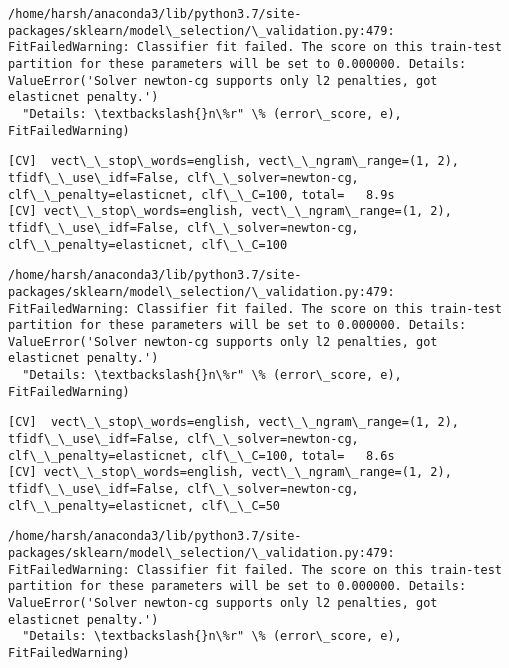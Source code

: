 \documentclass[11pt]{article}
\begin{document}
    \begin{Verbatim}[commandchars=\\\{\}]
/home/harsh/anaconda3/lib/python3.7/site-packages/sklearn/model\_selection/\_validation.py:479: FitFailedWarning: Classifier fit failed. The score on this train-test partition for these parameters will be set to 0.000000. Details: 
ValueError('Solver newton-cg supports only l2 penalties, got elasticnet penalty.')
  "Details: \textbackslash{}n\%r" \% (error\_score, e), FitFailedWarning)

    \end{Verbatim}

    \begin{Verbatim}[commandchars=\\\{\}]
[CV]  vect\_\_stop\_words=english, vect\_\_ngram\_range=(1, 2), tfidf\_\_use\_idf=False, clf\_\_solver=newton-cg, clf\_\_penalty=elasticnet, clf\_\_C=100, total=   8.9s
[CV] vect\_\_stop\_words=english, vect\_\_ngram\_range=(1, 2), tfidf\_\_use\_idf=False, clf\_\_solver=newton-cg, clf\_\_penalty=elasticnet, clf\_\_C=100 

    \end{Verbatim}

    \begin{Verbatim}[commandchars=\\\{\}]
/home/harsh/anaconda3/lib/python3.7/site-packages/sklearn/model\_selection/\_validation.py:479: FitFailedWarning: Classifier fit failed. The score on this train-test partition for these parameters will be set to 0.000000. Details: 
ValueError('Solver newton-cg supports only l2 penalties, got elasticnet penalty.')
  "Details: \textbackslash{}n\%r" \% (error\_score, e), FitFailedWarning)

    \end{Verbatim}

    \begin{Verbatim}[commandchars=\\\{\}]
[CV]  vect\_\_stop\_words=english, vect\_\_ngram\_range=(1, 2), tfidf\_\_use\_idf=False, clf\_\_solver=newton-cg, clf\_\_penalty=elasticnet, clf\_\_C=100, total=   8.6s
[CV] vect\_\_stop\_words=english, vect\_\_ngram\_range=(1, 2), tfidf\_\_use\_idf=False, clf\_\_solver=newton-cg, clf\_\_penalty=elasticnet, clf\_\_C=50 

    \end{Verbatim}

    \begin{Verbatim}[commandchars=\\\{\}]
/home/harsh/anaconda3/lib/python3.7/site-packages/sklearn/model\_selection/\_validation.py:479: FitFailedWarning: Classifier fit failed. The score on this train-test partition for these parameters will be set to 0.000000. Details: 
ValueError('Solver newton-cg supports only l2 penalties, got elasticnet penalty.')
  "Details: \textbackslash{}n\%r" \% (error\_score, e), FitFailedWarning)

    \end{Verbatim}
\end{document}
